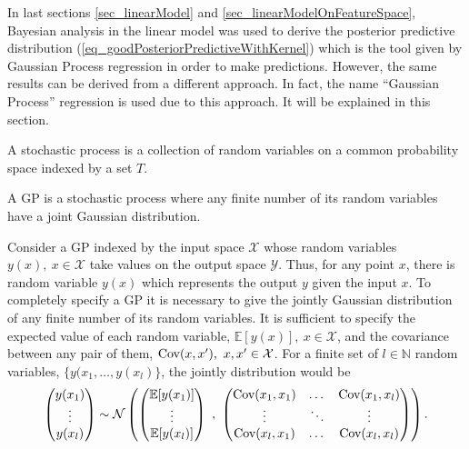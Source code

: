 In last sections \ref{sec_linearModel} and \ref{sec_linearModelOnFeatureSpace}, Bayesian analysis in the linear model was used to derive the posterior predictive distribution (\ref{eq_goodPosteriorPredictiveWithKernel}) which is the tool given by Gaussian Process regression in order to make predictions. However, the same results can be derived from a different approach. In fact, the name ``Gaussian Process'' regression is used due to this approach. It will be explained in this section.

\begin{definition} A stochastic process is a collection of random variables on a common probability space indexed by a set $T$.
\end{definition}

\begin{definition} A GP is a stochastic process where any finite number of its random variables have a joint Gaussian distribution.
\end{definition}

Consider a GP indexed by the input space $\mathcal{X}$ whose random variables $y(x), \ x \in \mathcal{X}$ take values on the output space $\mathcal{Y}$. Thus, for any point $x$, there is random variable $y(x)$ which represents the output $y$ given the input $x$. To completely specify a GP it is necessary to give the jointly Gaussian distribution of any finite number of its random variables. It is sufficient to specify the expected value of each random variable, $\mathbb{E}[y(x)], \ x \in \mathcal{X}$, and the covariance between any pair of them, $\textup{Cov}(x,x'), \ x,x' \in \mathcal{X}$. For a finite set of $l \in \mathbb{N}$ random variables, $\{y(x_1, \dots, y(x_l)\}$, the jointly distribution would be
\begin{equation} \label{eq_normalGP}
  \begin{pmatrix} y(x_1) \\ \vdots \\ y(x_l) \end{pmatrix} \sim
  \mathcal{N} \left(
  \begin{pmatrix}
  \mathbb{E}[y(x_1)] \\ \vdots \\ \mathbb{E}[y(x_l)] \\
  \end{pmatrix} \ , \ 
  \begin{pmatrix}
    \textup{Cov}(x_1,x_1) & \dots  & \textup{Cov}(x_1,x_l) \\
     \vdots    & \ddots & \vdots     \\
    \textup{Cov}(x_l,x_1) & \dots  & \textup{Cov}(x_l,x_l) \\
  \end{pmatrix}
  \right).
\end{equation}

